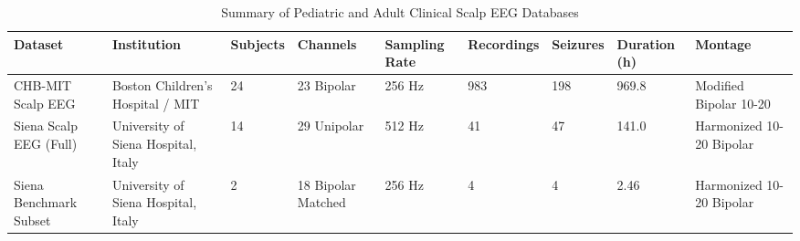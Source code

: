 \begin{table}[t]
\centering
\caption{Summary of Pediatric and Adult Clinical Scalp EEG Databases}
\label{tab:dataset_characteristics}
\small
\begin{tabular}{lllllllll}
\toprule
Dataset & Institution & Subjects & Channels & Sampling Rate & Recordings & Seizures & Duration (h) & Montage \\
\midrule
CHB-MIT Scalp EEG & Boston Children's Hospital / MIT & 24 & 23 Bipolar & 256 Hz & 983 & 198 & 969.8 & Modified Bipolar 10-20 \\
Siena Scalp EEG (Full) & University of Siena Hospital, Italy & 14 & 29 Unipolar & 512 Hz & 41 & 47 & 141.0 & Harmonized 10-20 Bipolar \\
Siena Benchmark Subset & University of Siena Hospital, Italy & 2 & 18 Bipolar Matched & 256 Hz & 4 & 4 & 2.46 & Harmonized 10-20 Bipolar \\
\bottomrule
\end{tabular}
\end{table}
